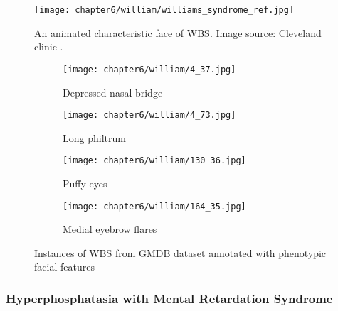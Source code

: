 \documentclass[../report.tex]{subfiles}
\begin{document}
	\begin{figure}[H]\label{fig_williams_char}
	\centering
	\texttt{[image: chapter6/william/williams\_syndrome\_ref.jpg]}	
	\caption[An animated characteristic face of WBS]{An animated characteristic face of WBS. Image source: Cleveland clinic \protect\footnotemark.} 
	\end{figure}
	\begin{figure}[H]\label{fig_williams}
		\centering
		\begin{subfigure}[t]{0.24\textwidth}
			\centering
			\texttt{[image: chapter6/william/4\_37.jpg]}
			\caption{Depressed nasal bridge}
		\end{subfigure}
		\begin{subfigure}[t]{0.24\textwidth}
			\centering
			\texttt{[image: chapter6/william/4\_73.jpg]}
			\caption{Long philtrum}
		\end{subfigure}	
			\begin{subfigure}[t]{0.24\textwidth}
			\centering
			\texttt{[image: chapter6/william/130\_36.jpg]}
			\caption{Puffy eyes}
		\end{subfigure}	
			\begin{subfigure}[t]{0.24\textwidth}
			\centering
			\texttt{[image: chapter6/william/164\_35.jpg]}
			\caption{Medial eyebrow flares}
		\end{subfigure}	
	\caption[Instances of WBS from GMDB dataset]{Instances of WBS from GMDB dataset annotated with phenotypic facial features}
	\end{figure}





	\subsubsection{Hyperphosphatasia with Mental Retardation Syndrome}
	 
\end{document}
